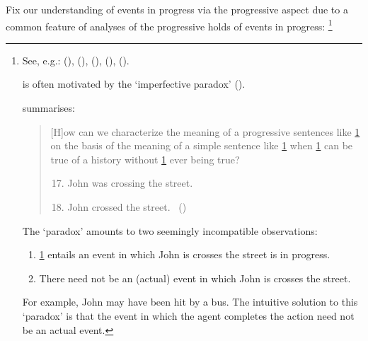 \begin{note}
  Fix our understanding of events in progress via the progressive aspect due to a common feature of analyses of the progressive holds of events in progress:%
  \footnote{
    See, e.g.:
    (\cite{Bennett:1972uw}),
    (\cite{Dowty:1979vq}),
    (\cite{Parsons:1990aa}),
    (\cite{Landman:1992wh}),
    (\cite{Portner:1998um}).

    \assuPP{} is often motivated by the `imperfective paradox' (\cite[cf.][Ch.3.1]{Dowty:1979vq}).

    \citeauthor{Bach:1986tb} summarises:
    \begin{quote}
      [H]ow can we characterize the meaning of a progressive sentences like \ref{Bach:impP:17} on the basis of the meaning of a simple sentence like \ref{Bach:impP:18} when \ref{Bach:impP:17} can be true of a history without \ref{Bach:impP:18} ever being true?
      \begin{enumerate}[label=(\arabic*), ref=(\arabic*)]
        \setcounter{enumi}{16}
      \item
        \label{Bach:impP:17}
        John was crossing the street.
      \item
        \label{Bach:impP:18}
        John crossed the street.%
        \mbox{ }\hfill\mbox{(\citeyear[12]{Bach:1986tb})}
      \end{enumerate}
    \end{quote}
    The `paradox' amounts to two seemingly incompatible observations:
    \begin{enumerate}[noitemsep]
    \item
      \ref{Bach:impP:17} entails an event in which John is crosses the street is in progress.
    \item
      There need not be an (actual) event in which John is crosses the street.%
    \end{enumerate}
    For example, John may have been hit by a bus.
    The intuitive solution to this `paradox' is that the event in which the agent completes the action need not be an actual event.
  }


\end{note}
